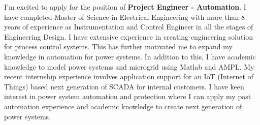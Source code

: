 \documentclass[11pt, a4paper]{ishan-cl} %
\newcommand{\positionname}{\textbf{Project Engineer - Automation}}%
\begin{document}
\makecvheader %
\makelettertitle %


\begin{cvletter}

I’m excited to apply for the position of \textbf{\positionname}. %
I have completed Master of Science in Electrical Engineering with more than 8 years of experience as Instrumentation and Control Engineer in all the stages of Engineering Design. I have extensive experience in creating engineering solution for process control systems. This has further motivated me to expand my knowledge in automation for power systems. In addition to this, I have academic knowledge to model power systems and microgrid using Matlab and AMPL. My recent internship experience involves application support for an IoT (Internet of Things) based next generation of SCADA for internal customers. I have keen interest in power system automation and protection where I can apply my past automation experience and academic knowledge to create next generation of power systems.

\end{cvletter}

\makeletterclosing %
\end{document}
